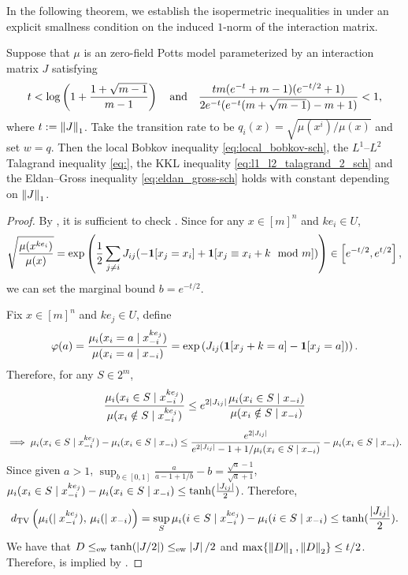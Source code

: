 In the following theorem, we establish the isopermetric inequalities in  under an explicit smallness condition on the induced $1$-norm of the interaction matrix.
\begin{theorem}\label{thm:Potts}
    Suppose that $\mu$ is an zero-field Potts model parameterized by an interaction matrix $J$ satisfying 
    \begin{equation}\label{eq:Potts_cond}
        t < \log\left(1+\frac{1+\sqrt{m-1}}{m-1}\right)
        \quad \text{and} \quad \frac{tm(e^{-t}+m-1)(e^{-t/2}+1)}{2e^{-t}(e^{-t}(m+\sqrt{m-1})-m+1)} < 1,
    \end{equation}
    where $t := \left\lVert J \right\rVert_1$.
    Take the transition rate to be $q_i(x) = \sqrt{\mu(x^i)/\mu(x)}$ and set $w = q$.
    Then the local Bobkov inequality \eqref{eq:local_bobkov-sch}, the $L^1$--$L^2$ Talagrand inequality \eqref{eq:}, the KKL inequality \eqref{eq:l1_l2_talagrand_2_sch} and the Eldan--Gross inequality \eqref{eq:eldan_gross-sch} holds with constant depending on $\left\lVert J \right\rVert_1$.
\end{theorem}
\begin{proof}
    By , it is sufficient to check .
    Since for any $x\in [m]^n$ and $ke_i\in U$,
    $$
        \sqrt{\frac{\mu(x^{ke_i})}{\mu(x)}}
        = \exp\left(\frac 12\sum_{j\neq i} J_{ij}(-\boldsymbol{1}[x_j=x_i] + \boldsymbol{1}[x_j\equiv x_i+k \mod m]) \right)
        \in \left[e^{-t/2},e^{t/2}\right] ,
    $$
    we can set the marginal bound $b = e^{-t/2}$.
    
    Fix $x\in [m]^n$ and $ke_j\in U$, define 
    $$
        \varphi(a) = \frac{\mu_i(x_i=a\mid x_{-i}^{k e_j})}{\mu(x_i=a\mid x_{-i})} = \exp\left(J_{ij}(\boldsymbol{1}[x_j+k=a]-\boldsymbol{1}[x_j=a])\right).
    $$
    Therefore, for any $S\in 2^m$,
    $$
        \frac{\mu_i(x_i\in S\mid x_{-i}^{k e_j})}{\mu(x_i\notin S\mid x_{-i}^{k e_j})}
        \leq e^{2\left\vert J_{ij}\right\vert}\frac{\mu_i(x_i\in S\mid x_{-i})}{\mu(x_i\notin S\mid x_{-i})}
    $$
    $$
        \implies \mu_i(x_i\in S\mid x_{-i}^{k e_j}) - \mu_i(x_i\in S\mid x_{-i})
        \leq \frac{e^{2\left\vert J_{ij}\right\vert}}{e^{2\left\vert J_{ij}\right\vert}-1+1/\mu_i(x_i\in S\mid x_{-i})} - \mu_i(x_i\in S\mid x_{-i}) .
    $$
    Since given $a > 1$, $\sup_{b\in [0,1]}\frac{a}{a-1+1/b}-b = \frac{\sqrt a - 1}{\sqrt a + 1}$, $\mu_i(x_i\in S\mid x_{-i}^{k e_j}) - \mu_i(x_i\in S\mid x_{-i}) \leq \tanh(\frac {\left\vert J_{ij}\right\vert}2)$.
    Therefore,
    $$
        d_{\mathrm{TV}}\left({\mu_i(\mid x_{-i}^{k e_j})},\,{\mu_i(\mid x_{-i})}\right) = \sup_S \mu_i(i\in S\mid x_{-i}^{k e_j}) - \mu_i(i\in S\mid x_{-i}) \leq \tanh(\frac{\left\vert J_{ij}\right\vert}{2}) .
    $$
    We have that $D \leq_{\mathrm{ew}} \tanh(\left\vert J/2\right\vert) \leq_{\mathrm{ew}} \left\vert J\right\vert/2$ and $\max\{\left\lVert D \right\rVert_1,\left\lVert D \right\rVert_2\} \leq t/2$.
    Therefore,  is implied by .
\end{proof}
